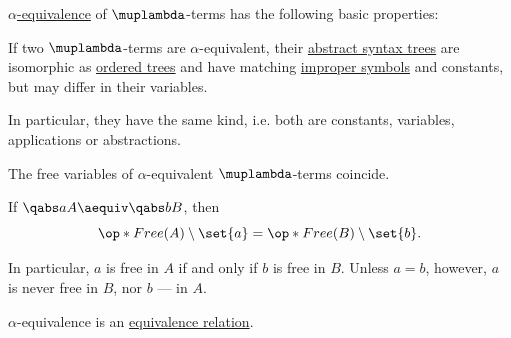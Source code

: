 \begin{proposition}\label{thm:def:lambda_term_alpha_equivalence}
  \hyperref[def:lambda_term_alpha_equivalence]{\( \alpha \)-equivalence} of \( \muplambda \)-terms has the following basic properties:
  \begin{thmenum}
     If two \( \muplambda \)-terms are \( \alpha \)-equivalent, their \hyperref[def:lambda_term_ast]{abstract syntax trees} are isomorphic as \hyperref[def:ordered_tree]{ordered trees} and have matching \hyperref[def:lambda_term_alphabet]{improper symbols} and constants, but may differ in their variables.

    In particular, they have the same kind, i.e. both are constants, variables, applications or abstractions.

     The free variables of \( \alpha \)-equivalent \( \muplambda \)-terms coincide.

     If \( \qabs a A \aequiv \qabs b B \), then
    \begin{equation}\label{eq:thm:def:lambda_term_alpha_equivalence/abstraction_body_free}
      \op*{Free}(A) \setminus \set{ a } = \op*{Free}(B) \setminus \set{ b }.
    \end{equation}

    In particular, \( a \) is free in \( A \) if and only if \( b \) is free in \( B \). Unless \( a = b \), however, \( a \) is never free in \( B \), nor \( b \) --- in \( A \).

     \( \alpha \)-equivalence is an \hyperref[def:equivalence_relation]{equivalence relation}.
  \end{thmenum}
\end{proposition}

